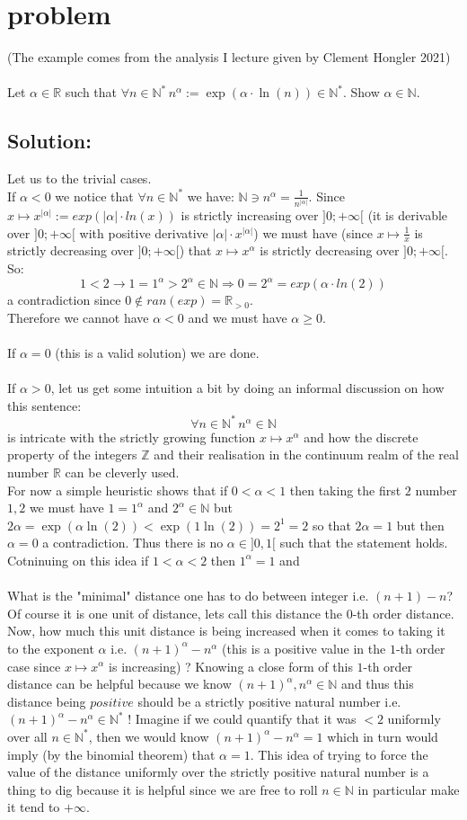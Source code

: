 \documentclass[11pt, a4paper, oneside]{article}
\newcommand{\problem}[1][]{\section{#1} \hfill \par}
\newcommand{\solution}[1][]{\subsection*{#1}\hfill \par}
\theoremstyle{remark}
\theoremstyle{lemma}
\begin{document}
\newpage
\problem[problem]
(The example comes from the analysis I lecture given by Clement Hongler 2021)
\\\\
Let $\alpha\in\mathbb{R}$ such that $\forall n\in\mathbb{N}^{*}\, n^\alpha:=\exp(\alpha\cdot\ln(n))\in\mathbb{N}^{*}$. Show $\alpha\in\mathbb{N}$.
\solution[Solution:]
Let us to the trivial cases.
\\
If $\alpha<0$ we notice that $\forall n\in\mathbb{N}^{*}$ we have:
$\mathbb{N}\ni n^{\alpha}=\frac{1}{n^{|\alpha|}}$. Since $x\mapsto x^{|\alpha|}:=exp(|\alpha|\cdot ln(x))$ is strictly increasing over $]0;+\infty[$ (it is derivable over $]0;+\infty[$ with positive derivative $|\alpha|\cdot x^{|\alpha|}$) we must have (since $x\mapsto\frac{1}{x}$ is strictly decreasing over $]0;+\infty[$) that $x\mapsto x^{\alpha}$ is strictly decreasing over $]0;+\infty[$. So:
$$1<2\rightarrow 1=1^{\alpha}>2^{\alpha}\in\mathbb{N}\Rightarrow 0=2^{\alpha}=exp(\alpha\cdot ln(2))$$
a contradiction since $0\notin ran(exp)=\mathbb{R}_{>0}$.
\\
Therefore we cannot have $\alpha<0$ and we must have $\alpha\geq 0$.
\\\\
If $\alpha=0$ (this is a valid solution) we are done.
\\\\
If $\alpha>0$, let us get some intuition a bit by doing an informal discussion on how this sentence:
$$\forall n\in\mathbb{N}^{*}\, n^{\alpha}\in\mathbb{N}$$
is intricate with the strictly growing function $x\mapsto x^{\alpha}$ and how the discrete property of the integers $\mathbb{Z}$ and their realisation in the continuum realm of the real number $\mathbb{R}$ can be cleverly used.
\\
For now a simple heuristic shows that if $0<\alpha<1$ then taking the first $2$ number $1,2$ we must have $1=1^{\alpha}$ and $2^\alpha\in\mathbb{N}$ but $ 2\alpha=\exp(\alpha\ln(2))<\exp(1\ln(2))=2^1=2$ so that $2\alpha=1$ but then $\alpha=0$ a contradiction. Thus there is no $\alpha\in]0,1[$ such that the statement holds. Cotninuing on this idea if $1<\alpha<2$ then $1^{\alpha}=1$ and 
\\\\
What is the "minimal" distance one has to do between integer i.e. $(n+1)-n$? Of course it is one unit of distance, lets call this distance the $0$-th order distance. Now, how much this unit distance is being increased when it comes to taking it to the exponent $\alpha$ i.e. $(n+1)^{\alpha}-n^{\alpha}$ (this is a positive value in the $1$-th order case since $x\mapsto x^{\alpha}$ is increasing) ? Knowing a close form of this $1$-th order distance can be helpful because we know $(n+1)^{\alpha},n^{\alpha}\in\mathbb{N}$ and thus this distance being $positive$ should be a strictly positive natural number i.e.  $(n+1)^{\alpha}-n^{\alpha}\in\mathbb{N}^{*}$ ! Imagine if we could quantify that it was $<2$ uniformly over all $n\in\mathbb{N}^{*}$, then we would know $(n+1)^{\alpha}-n^{\alpha}=1$ which in turn would imply (by the binomial theorem) that $\alpha=1$. This idea of trying to force the value of the distance uniformly over the strictly positive natural number is a thing to dig because it is helpful since we are free to roll $n\in\mathbb{N}$ in particular make it tend to $+\infty$.
\end{document}

